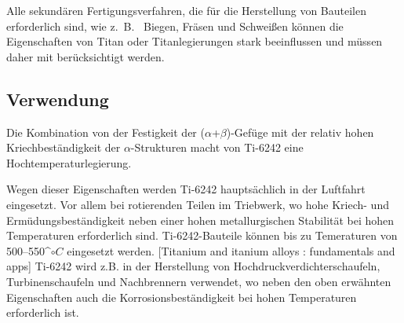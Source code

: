 Alle sekundären Fertigungsverfahren, die für die Herstellung von Bauteilen erforderlich sind, wie z.~B.~ Biegen, Fräsen und Schweißen können die  Eigenschaften von Titan oder Titanlegierungen stark beeinflussen und müssen daher mit berücksichtigt werden.




\subsection{Verwendung}


Die Kombination von der Festigkeit der ($\alpha$+$\beta$)-Gefüge mit der relativ hohen Kriechbeständigkeit der $\alpha$-Strukturen macht von Ti-6242 eine Hochtemperaturlegierung. 

Wegen dieser Eigenschaften werden Ti-6242 hauptsächlich in der Luftfahrt eingesetzt. Vor allem bei rotierenden Teilen im Triebwerk, wo hohe Kriech- und Ermüdungsbeständigkeit neben einer hohen metallurgischen Stabilität bei hohen Temperaturen erforderlich sind. 
Ti-6242-Bauteile können bis zu Temeraturen von  500--550^$\circ C$ eingesetzt werden. [Titanium and itanium alloys : fundamentals and apps]
Ti-6242 wird z.B. in der Herstellung von Hochdruckverdichterschaufeln, Turbinenschaufeln und Nachbrennern verwendet, wo neben den oben erwähnten Eigenschaften auch die Korrosionsbeständigkeit bei hohen Temperaturen erforderlich ist. 



